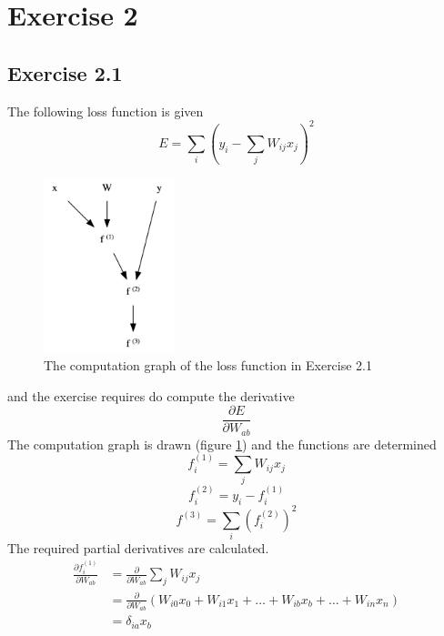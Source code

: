 \documentclass[fleqn]{report}
\begin{document}
\section*{Exercise 2}

\subsection*{Exercise 2.1}
The following loss function is given
\begin{equation}
    E = \sum_i \left( y_i - \sum_j W_{ij} x_j \right )^2
\end{equation}
\begin{figure}
    \centering
    \includegraphics[height=2in]{cg21.png}
    \caption{The computation graph of the loss function in Exercise 2.1}
    \label{fig:cg21}
\end{figure}
and the exercise requires do compute the derivative
\begin{equation}
    \frac{\partial E}{\partial W_{ab}}
\end{equation}
The computation graph is drawn (figure \ref{fig:cg21}) and the functions are determined
\begin{equation}
    f^{(1)}_i = \sum_j W_{ij} x_j
\end{equation}
\begin{equation}
    f^{(2)}_i = y_i - f^{(1)}_i
\end{equation}
\begin{equation}
    f^{(3)} = \sum_i \left( f^{(2)}_i \right )^2
\end{equation}
The required partial derivatives are calculated.
\begin{equation}
    \begin{split}
        \frac{\partial f^{(1)}_i}{\partial W_{ab}} & =
        \frac{\partial}{\partial W_{ab}} \sum_j W_{ij} x_j \\
        & = \frac{\partial}{\partial W_{ab}} \left ( W_{i0} x_0 + W_{i1} x_1 + \dots + W_{ib} x_b + \dots + W_{in} x_n \right ) \\
        & = \delta_{ia} x_b
    \end{split}
\end{equation}
\end{document}
